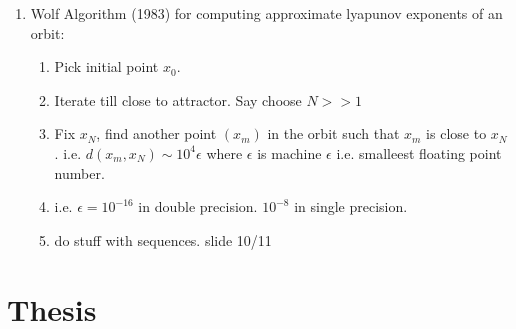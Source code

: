 \documentclass[11pt]{article}
\newcommand{\e}{\epsilon}
\begin{document}
\begin{enumerate}
\begin{enumerate}
                    \item Wolf Algorithm (1983) for computing approximate lyapunov exponents of an orbit:
                        \begin{enumerate}
                            \item Pick initial point $x_0$. 
                            \item Iterate till close to attractor. Say choose $N >> 1$ 
                            \item Fix $x_N$, find another point $(x_m)$ in the orbit such that $x_m$ is close to $x_N$. i.e. $d(x_m, x_N) \sim 10^4 \epsilon$ where $\e$ is machine $\e$ i.e. smalleest floating point number. 
                            \item i.e. $\e = 10^{-16}$ in double precision. $10^{-8}$ in single precision. 
                            \item do stuff with sequences. slide 10/11
                        \end{enumerate}
                \end{enumerate}
        \end{enumerate}

\section{Thesis}
\end{document}

